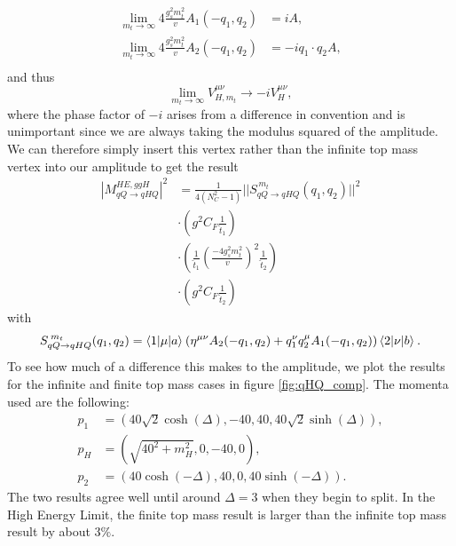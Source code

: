 \begin{equation}
\begin{split}
\lim_{m_t \to \infty} 4 \frac{g_s^2 m_t^2}{v}A_1(-q_1,q_2) &= i A, \\
\lim_{m_t \to \infty} 4 \frac{g_s^2 m_t^2}{v}A_2(-q_1,q_2) &= -i q_1 \cdot q_2 A, \\
\end{split}
\end{equation}
and thus
\begin{equation}
\lim_{m_t \to \infty}V^{\mu \nu}_{H, m_t} \to -i V^{\mu \nu}_H,
\end{equation}
where the phase factor of $-i$ arises from a difference in convention and is unimportant since we are always taking the modulus squared of the amplitude. We can therefore simply insert this vertex rather than the infinite top mass vertex into our amplitude to get the result
\begin{equation}
\begin{split}
|M_{qQ \to qHQ}^{HE,ggH}|^2 &= \frac{1}{4(N_C^2 - 1)} ||S_{qQ \to qHQ}^{\hspace{2pt} m_t}(q_1, q_2)||^2 \\
& \cdot \left(g^2 C_F \frac{1}{\hat{t}_1} \right) \\
& \cdot \left(\frac{1}{\hat{t}_1} \left(\frac{-4 g_s^2 m_t^2}{v} \right)^2 \frac{1}{\hat{t}_2} \right) \\
& \cdot \left(g^2 C_F \frac{1}{\hat{t}_2} \right)
\end{split}
\end{equation}
with
\begin{equation}
S_{qQ \to qHQ}^{\hspace{2pt} m_t}(q_1, q_2) = \mathinner{\langle1\vert\mu\vert a\rangle}_{} (\eta^{\mu \nu}A_2(-q_1,q_2) + q_1^\nu q_2^\mu A_1(-q_1,q_2))\mathinner{\langle2\vert\nu\vert b\rangle}_{}. 
\end{equation} 
To see how much of a difference this makes to the amplitude, we plot the results for the infinite and finite top mass cases in figure \ref{fig:qHQ_comp}. The momenta used are the following:
\begin{subequations}
\begin{align}
p_1 &= (40 \sqrt{2} \cosh(\Delta),-40,40,40 \sqrt{2} \sinh(\Delta)), \\
p_H &= (\sqrt{40^2+m_H^2}, 0,-40,0), \\
p_2 &= (40 \cosh(-\Delta),40,0,40 \sinh(-\Delta)).
\end{align}
\end{subequations}
The two results agree well until around $\Delta = 3$ when they begin to split. In the High Energy Limit, the finite top mass result is larger than the infinite top mass result by about $3\%$. 
